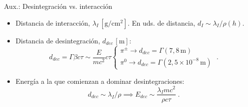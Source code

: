\documentclass{beamer}
\begin{document}
\begin{frame}[noframenumbering]{Aux.: Desintegración vs. interacción}
	\begin{itemize}
		\item Distancia de interacción, $\lambda_I\,\left[\mathrm{g/cm^2}\right]$. En uds. de distancia, $d_I\sim\lambda_I/\rho(h)$.
		\item  Distancia de desintegración, $d_{dec}\,\left[\mathrm{m}\right]$: $$d_{dec}=\Gamma\beta c\tau\sim\frac{E}{mc^2}c\tau\left\{\begin{array}{l}\pi^\pm\rightarrow d_{dec}=\Gamma\left(7,8 \,\mathrm{m}\right)\\
			\pi^0\rightarrow d_{dec}=\Gamma\left(2,5\times10^{-8}\,\mathrm{m}\right)\end{array}\right.\;.$$
		\item Energía a la que comienzan a dominar desintegraciones: $$d_{dec}\sim\lambda_I/\rho\implies E_{dec}\sim \frac{\lambda_I mc^2}{\rho c \tau} \;.$$
	\end{itemize}
\end{frame}
\end{document}
